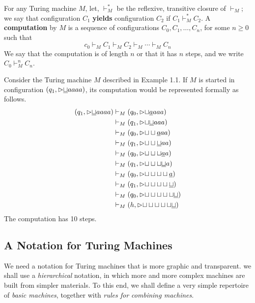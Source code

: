 \begin{definition}{}
For any Turing machine $M$, let, $\vdash_M^*$ be the reflexive, transitive 
closure of $\vdash_M$; we say that configuration $C_1$ \textbf{yields} configuration $C_2$ if $C_1 \vdash_M^* C_2$. A \textbf{computation} by $M$ is a sequence of configurations $C_0, C_1 , \ldots, C_n$, for some $n \geq 0$ such that
\begin{equation*}
  c_0 \vdash_M C_1 \vdash_M C_2 \vdash_M \cdots \vdash_M C_n
\end{equation*}
\noindent We say that the computation is of length $n$ or that it has $n$ steps, and we write $C_0 \vdash_M^n C_n$.
\end{definition}
Consider the Turing machine $M$ described in Example 1.1. If $M$ is started in configuration $(q_1, {\vartriangleright}\underline{\sqcup}aaaa)$, its computation would be represented formally as follows.
\begin{align*}
  (q_1, {\vartriangleright}\underline{\sqcup}aaaa) 
      &\vdash_M (q_0, {\vartriangleright}{\sqcup}\underline{a}aaa)\\
      &\vdash_M (q_1, {\vartriangleright}{\sqcup}\underline{\sqcup}aaa)\\
      &\vdash_M (q_0, {\vartriangleright}{\sqcup}\sqcup\underline{a}aa)\\
      &\vdash_M (q_1, {\vartriangleright}{\sqcup}\sqcup\underline{\sqcup}aa)\\
      &\vdash_M (q_0, {\vartriangleright}{\sqcup}\sqcup\sqcup\underline{a}a)\\
      &\vdash_M (q_1, {\vartriangleright}{\sqcup}\sqcup\sqcup\underline{\sqcup}a)\\
      &\vdash_M (q_0, {\vartriangleright}{\sqcup}\sqcup\sqcup\sqcup\underline{a})\\
      &\vdash_M (q_1, {\vartriangleright}{\sqcup}\sqcup\sqcup\sqcup\underline{\sqcup})\\
      &\vdash_M (q_0, {\vartriangleright}{\sqcup}\sqcup\sqcup\sqcup\sqcup\underline{\sqcup})\\
      &\vdash_M (h, {\vartriangleright}{\sqcup}\sqcup\sqcup\sqcup\sqcup\underline{\sqcup})      
\end{align*}
The computation has 10 steps.

\subsection{A Notation for Turing Machines}

We need a notation for Turing machines that is more graphic and transparent. we shall use a \textit{hierarchical} notation, in which more and more complex machines are built from simpler materials. To this end, we shall define a very simple repertoire of \textit{basic machines}, together with \textit{rules for combining machines}.

